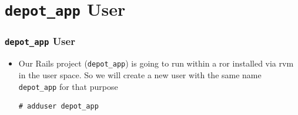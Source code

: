 \documentclass{beamer}
\begin{document}
\section{\texttt{depot\_app} User }
\begin{frame}[fragile]
\frametitle{\texttt{depot\_app} User}
\begin{itemize}

\item Our Rails project (\texttt{depot\_app}) is going to run within a \acrshort{ror} installed via \acrshort{rvm} in the user space. So we will create a new  user with the same name \texttt{depot\_app} for that purpose

\lstset{language=shell, escapechar=!}
\begin{lstlisting}[escapechar=!]
# adduser depot_app
\end{lstlisting}


\end{itemize}


\end{frame}
\end{document}
